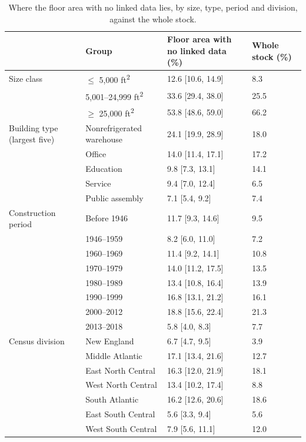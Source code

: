 \begin{table}[!htbp]
\centering
\footnotesize\linespread{1}\selectfont
\caption{Where the floor area with no linked data lies, by size, type, period and division, against the whole stock.}
\label{tab:table_zero_profile}
\setlength{\tabcolsep}{4pt}
\begin{tabular}{L{2.4cm}L{3.8cm}L{3.0cm}L{1.8cm}}
\toprule
 & Group & Floor area with no linked data (\%) & Whole stock (\%) \\
\midrule
Size class & $\leq$ 5,000 ft\textsuperscript{2} & 12.6 [10.6, 14.9] & 8.3 \\
 & 5,001--24,999 ft\textsuperscript{2} & 33.6 [29.4, 38.0] & 25.5 \\
 & $\geq$ 25,000 ft\textsuperscript{2} & 53.8 [48.6, 59.0] & 66.2 \\
Building type (largest five) & Nonrefrigerated warehouse & 24.1 [19.9, 28.9] & 18.0 \\
 & Office & 14.0 [11.4, 17.1] & 17.2 \\
 & Education & 9.8 [7.3, 13.1] & 14.1 \\
 & Service & 9.4 [7.0, 12.4] & 6.5 \\
 & Public assembly & 7.1 [5.4, 9.2] & 7.4 \\
Construction period & Before 1946 & 11.7 [9.3, 14.6] & 9.5 \\
 & 1946--1959 & 8.2 [6.0, 11.0] & 7.2 \\
 & 1960--1969 & 11.4 [9.2, 14.1] & 10.8 \\
 & 1970--1979 & 14.0 [11.2, 17.5] & 13.5 \\
 & 1980--1989 & 13.4 [10.8, 16.4] & 13.9 \\
 & 1990--1999 & 16.8 [13.1, 21.2] & 16.1 \\
 & 2000--2012 & 18.8 [15.6, 22.4] & 21.3 \\
 & 2013--2018 & 5.8 [4.0, 8.3] & 7.7 \\
Census division & New England & 6.7 [4.7, 9.5] & 3.9 \\
 & Middle Atlantic & 17.1 [13.4, 21.6] & 12.7 \\
 & East North Central & 16.3 [12.0, 21.9] & 18.1 \\
 & West North Central & 13.4 [10.2, 17.4] & 8.8 \\
 & South Atlantic & 16.2 [12.6, 20.6] & 18.6 \\
 & East South Central & 5.6 [3.3, 9.4] & 5.6 \\
 & West South Central & 7.9 [5.6, 11.1] & 12.0 \\

\end{tabular}
\end{table}
